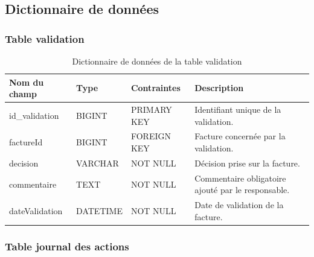 \subsection{Dictionnaire de données}

\subsubsection{Table validation}

\renewcommand{\arraystretch}{1.3}

\begin{table}[H]
	\centering
	\footnotesize
	
	\begin{tabularx}{\textwidth}{|p{3cm}|p{2.5cm}|p{3.5cm}|X|}
		\hline
		
		\rowcolor{blue!20}
		\textbf{Nom du champ}
		&
		\textbf{Type}
		&
		\textbf{Contraintes}
		&
		\textbf{Description}
		\\ \hline
		
		id\_validation
		&
		BIGINT
		&
		PRIMARY KEY
		&
		Identifiant unique de la validation.
		\\ \hline
		
		factureId
		&
		BIGINT
		&
		FOREIGN KEY
		&
		Facture concernée par la validation.
		\\ \hline
		
		decision
		&
		VARCHAR
		&
		NOT NULL
		&
		Décision prise sur la facture.
		\\ \hline
		
		commentaire
		&
		TEXT
		&
		NOT NULL
		&
		Commentaire obligatoire ajouté par le responsable.
		\\ \hline
		
		dateValidation
		&
		DATETIME
		&
		NOT NULL
		&
		Date de validation de la facture.
		\\ \hline
		
	\end{tabularx}
	
	\caption{Dictionnaire de données de la table validation}
	\label{tab:validation_table}
	
\end{table}



\subsubsection{Table journal des actions}

